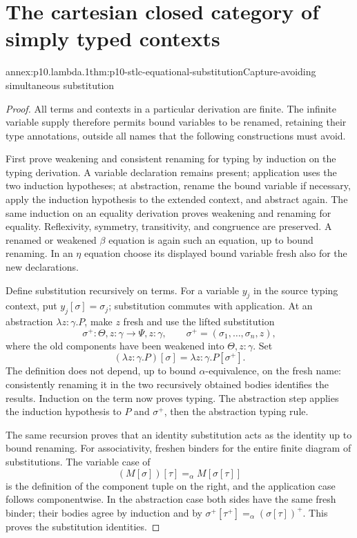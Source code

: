 
\section{The cartesian closed category of simply typed contexts}

\begin{annexitem}{annex:p10.lambda.1}{thm:p10-stlc-equational-substitution}{Capture-avoiding simultaneous substitution}
\begin{proof}
All terms and contexts in a particular derivation are finite.
The infinite variable supply therefore permits bound variables
to be renamed, retaining their type annotations, outside all
names that the following constructions must avoid.

First prove weakening and consistent renaming for typing by
induction on the typing derivation.  A variable declaration
remains present; application uses the two induction hypotheses;
at abstraction, rename the bound variable if necessary, apply
the induction hypothesis to the extended context, and abstract
again.  The same induction on an equality derivation proves
weakening and renaming for equality.  Reflexivity, symmetry,
transitivity, and congruence are preserved.  A renamed or
weakened \(\beta\) equation is again such an equation, up to
bound renaming.  In an \(\eta\) equation choose its displayed
bound variable fresh also for the new declarations.

Define substitution recursively on terms.  For a variable
\(y_j\) in the source typing context, put \(y_j[\sigma]=\sigma_j\);
substitution commutes with application.  At an abstraction
\(\lambda z{:}\gamma.P\), make \(z\) fresh and use the lifted
substitution
\[
 \sigma^+:\Theta,z{:}\gamma\longrightarrow\Psi,z{:}\gamma,
 \qquad
 \sigma^+=(\sigma_1,\ldots,\sigma_n,z),
\]
where the old components have been weakened into
\(\Theta,z{:}\gamma\).  Set
\[
       (\lambda z{:}\gamma.P)[\sigma]
                =\lambda z{:}\gamma.P[\sigma^+].
\]
The definition does not depend, up to bound
\(\alpha\)-equivalence, on the fresh name: consistently
renaming it in the two recursively obtained bodies identifies
the results.  Induction on the term now proves typing.
The abstraction step applies the induction hypothesis to
\(P\) and \(\sigma^+\), then the abstraction typing rule.

The same recursion proves that an identity substitution acts
as the identity up to bound renaming.  For associativity,
freshen binders for the entire finite diagram of substitutions.
The variable case of
\[
                   (M[\sigma])[\tau]=_\alpha M[\sigma[\tau]]
\]
is the definition of the component tuple on the right, and
the application case follows componentwise.  In the abstraction
case both sides have the same fresh binder; their bodies agree
by induction and by
\(\sigma^+[\tau^+]=_\alpha(\sigma[\tau])^+\).
This proves the substitution identities.


\end{proof}
\end{annexitem}
